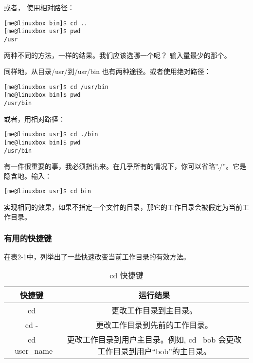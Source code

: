 \par 或者， 使用相对路径：

\begin{lstlisting}
[me@linuxbox bin]$ cd ..
[me@linuxbox usr]$ pwd
/usr
\end{lstlisting}

\par 两种不同的方法，一样的结果。我们应该选哪一个呢？ 输入量最少的那个。

\par 同样地，从目录/usr/到/usr/bin 也有两种途径。或者使用绝对路径：

\begin{lstlisting}
[me@linuxbox usr]$ cd /usr/bin
[me@linuxbox bin]$ pwd
/usr/bin
\end{lstlisting}

\par 或者，用相对路径：

\begin{lstlisting}
[me@linuxbox usr]$ cd ./bin
[me@linuxbox bin]$ pwd
/usr/bin
\end{lstlisting}

\par 有一件很重要的事，我必须指出来。在几乎所有的情况下，你可以省略”./”。它是隐含地。输入：
\begin{lstlisting}
[me@linuxbox usr]$ cd bin
\end{lstlisting}

\par 实现相同的效果，如果不指定一个文件的目录，那它的工作目录会被假定为当前工作目录。


\subsubsection{有用的快捷键} %
\label{ssub:有用的快捷键}
在表2-1中，列举出了一些快速改变当前工作目录的有效方法。


\begin{table}[ht!]
\caption{cd 快捷键}
\label{table_example}
\centering
\begin{tabular}{c|c}
\hline
 快捷键 & 运行结果 \\
\hline
  cd	& 更改工作目录到主目录。 \\
  cd -	& 更改工作目录到先前的工作目录。\\
cd ~user\_name	& 更改工作目录到用户主目录。例如, cd ~bob 会更改工作目录到用户“bob”的主目录。\\
\hline
\end{tabular}
\end{table}


